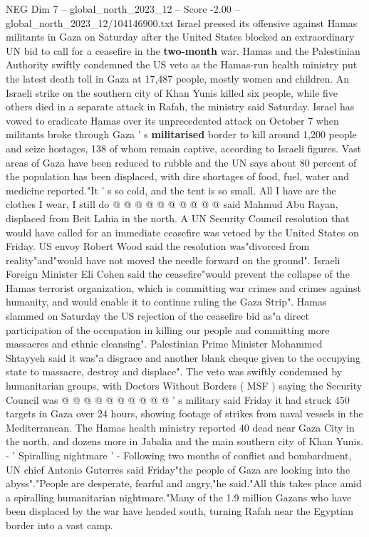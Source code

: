\begin{textsample}{NEG Dim 7 – global\_north\_2023\_12 – Score -2.00 – global\_north\_2023\_12/104146900.txt}  \label{ex:f7_neg_300}
Israel pressed its offensive against Hamas militants in Gaza on Saturday after the United States blocked an extraordinary UN bid to call for a ceasefire in the \textbf{two-month} war.
Hamas and the Palestinian Authority swiftly condemned the US veto as the Hamas-run health ministry put the latest death toll in Gaza at 17,487 people, mostly women and children.
An Israeli strike on the southern city of Khan Yunis killed six people, while five others died in a separate attack in Rafah, the ministry said Saturday.
Israel has vowed to eradicate Hamas over its unprecedented attack on October 7 when militants broke through Gaza ' s \textbf{militarised} border to kill around 1,200 people and seize hostages, 138 of whom remain captive, according to Israeli figures.
Vast areas of Gaza have been reduced to rubble and the UN says about 80 percent of the population has been displaced, with dire shortages of food, fuel, water and medicine reported."It ' s so cold, and the tent is so small.
All I have are the clothes I wear, I still do @ @ @ @ @ @ @ @ @ @ said Mahmud Abu Rayan, displaced from Beit Lahia in the north.
A UN Security Council resolution that would have called for an immediate ceasefire was vetoed by the United States on Friday.
US envoy Robert Wood said the resolution was"divorced from reality"and"would have not moved the needle forward on the ground".
Israeli Foreign Minister Eli Cohen said the ceasefire"would prevent the collapse of the Hamas terrorist organization, which is committing war crimes and crimes against humanity, and would enable it to continue ruling the Gaza Strip".
Hamas slammed on Saturday the US rejection of the ceasefire bid as"a direct participation of the occupation in killing our people and committing more massacres and ethnic cleansing".
Palestinian Prime Minister Mohammed Shtayyeh said it was"a disgrace and another blank cheque given to the occupying state to massacre, destroy and displace".
The veto was swiftly condemned by humanitarian groups, with Doctors Without Borders ( MSF ) saying the Security Council was @ @ @ @ @ @ @ @ @ @ ' s military said Friday it had struck 450 targets in Gaza over 24 hours, showing footage of strikes from naval vessels in the Mediterranean.
The Hamas health ministry reported 40 dead near Gaza City in the north, and dozens more in Jabalia and the main southern city of Khan Yunis. - ' Spiralling nightmare ' - Following two months of conflict and bombardment, UN chief Antonio Guterres said Friday"the people of Gaza are looking into the abyss"."People are desperate, fearful and angry,"he said."All this takes place amid a spiralling humanitarian nightmare."Many of the 1.9 million Gazans who have been displaced by the war have headed south, turning Rafah near the Egyptian border into a vast camp.

\end{textsample}
